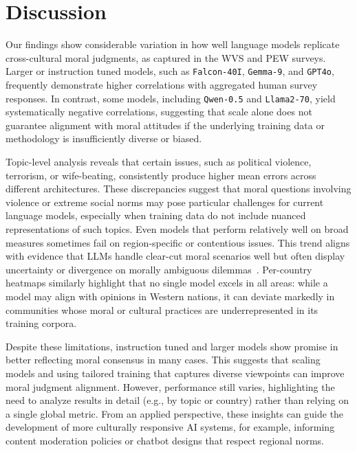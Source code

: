 \documentclass[runningheads]{llncs}
\begin{document}
\section{Discussion}
\label{sec:discussion_Conclusion}
Our findings show considerable variation in how well language models replicate cross-cultural moral judgments, as captured in the WVS and PEW surveys. Larger or instruction tuned models, such as \texttt{Falcon-40I}, \texttt{Gemma-9}, and \texttt{GPT4o}, frequently demonstrate higher correlations with aggregated human survey responses. In contrast, some models, including \texttt{Qwen-0.5} and \texttt{Llama2-70}, yield systematically negative correlations, suggesting that scale alone does not guarantee alignment with moral attitudes if the underlying training data or methodology is insufficiently diverse or biased.

Topic-level analysis reveals that certain issues, such as political violence, terrorism, or wife-beating, consistently produce higher mean errors across different architectures. These discrepancies suggest that moral questions involving violence or extreme social norms may pose particular challenges for current language models, especially when training data do not include nuanced representations of such topics. Even models that perform relatively well on broad measures sometimes fail on region-specific or contentious issues. This trend aligns with evidence that LLMs handle clear-cut moral scenarios well but often display uncertainty or divergence on morally ambiguous dilemmas~\cite{scherrer2023evaluating}. Per-country heatmaps similarly highlight that no single model excels in all areas: while a model may align with opinions in Western nations, it can deviate markedly in communities whose moral or cultural practices are underrepresented in its training corpora.

Despite these limitations, instruction tuned and larger models show promise in better reflecting moral consensus in many cases. This suggests that scaling models and using tailored training that captures diverse viewpoints can improve moral judgment alignment. However, performance still varies, highlighting the need to analyze results in detail (e.g., by topic or country) rather than relying on a single global metric. From an applied perspective, these insights can guide the development of more culturally responsive AI systems, for example, informing content moderation policies or chatbot designs that respect regional norms.
\end{document}
